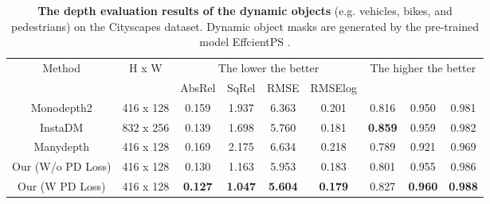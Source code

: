 \documentclass[journal]{IEEEtran}
\begin{document}
\begin{table*}
\centering
\caption{\textbf{The depth evaluation results of the dynamic objects} (e.g. vehicles, bikes, and pedestrians) on the Cityscapes dataset. Dynamic object masks are generated by the pre-trained model EffcientPS \cite{mohan2021efficientps}.}
\label{tab:7}
\begin{tabular}{ccccccccc}
\toprule[1pt]
\multirow{2}{*}{Method} & \multirow{2}{*}{H x W} & \multicolumn{4}{c}{The lower the better} & \multicolumn{3}{c}{The higher the better}              \\ \cline{3-9} 
                        &                          & AbsRel   & SqRel   & RMSE    & RMSElog   &  &  &  \\ \hline
Monodepth2 \cite{monodepth2} & 416 x 128 & 0.159 & 1.937 & 6.363 & 0.201 & 0.816 & 0.950 & 0.981\\
InstaDM \cite{lee2021learning} & 832 x 256 & 0.139 & 1.698 &  5.760 & 0.181 & \textbf{0.859} & 0.959 & 0.982\\
Manydepth \cite{manydepth} & 416 x 128 & 0.169 & 2.175 & 6.634 & 0.218 & 0.789 & 0.921 & 0.969\\ \hline
Our (W/o PD Loss) & 416 x 128 & 0.130 & 1.163 & 5.953 & 0.183 & 0.801 & 0.955 & 0.986 \\
Our (W PD Loss) & 416 x 128 & \textbf{0.127} & \textbf{1.047} & \textbf{5.604} & \textbf{0.179} & 0.827 & \textbf{0.960} & \textbf{0.988} \\\bottomrule[1pt]
\end{tabular}
\end{table*}
\end{document}
